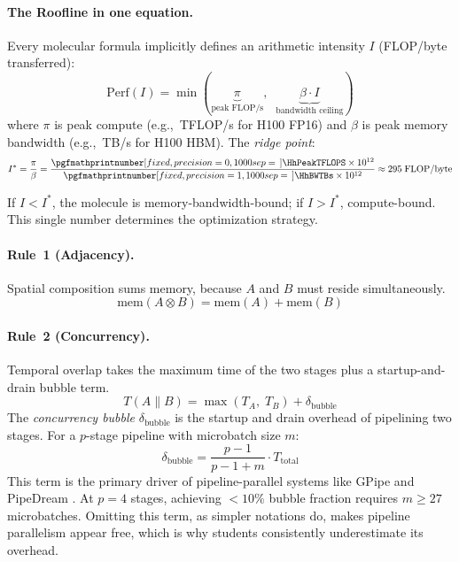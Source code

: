 \documentclass[10pt,twocolumn]{article}
\newcommand{\cval}[1]{\pgfmathprintnumber[fixed, precision=1, 1000 sep={\,}]{#1}}
\newcommand{\cvalint}[1]{\pgfmathprintnumber[fixed, precision=0, 1000 sep={\,}]{#1}}
\begin{document}
\paragraph{The Roofline in one equation.} Every molecular formula implicitly defines an arithmetic intensity $I$ (FLOP/byte transferred):
\begin{equation}
\label{eq:roofline}
\text{Perf}(I) = \min\!\left(\underbrace{\pi}_{\text{peak FLOP/s}},\;\; \underbrace{\beta \cdot I}_{\text{bandwidth ceiling}}\right)
\end{equation}
where $\pi$ is peak compute (e.g., \cvalint{\HhPeakTFLOPS}\,TFLOP/s for H100 FP16) and $\beta$ is peak memory bandwidth (e.g., \cval{\HhBWTBs}\,TB/s for H100 HBM). The \emph{ridge point}:
\begin{equation}
\label{eq:ridge}
I^{*} = \frac{\pi}{\beta} = \frac{\cvalint{\HhPeakTFLOPS} \times 10^{12}}{\cval{\HhBWTBs} \times 10^{12}} \approx 295 \;\text{FLOP/byte}
\end{equation}

If $I < I^{*}$, the molecule is memory-bandwidth-bound; if $I > I^{*}$, compute-bound. This single number determines the optimization strategy.

\paragraph{Rule~1 (Adjacency).} Spatial composition sums memory, because $A$ and $B$ must reside simultaneously.
\begin{equation}
\label{eq:parallel-mem}
\text{mem}(A \otimes B) = \text{mem}(A) + \text{mem}(B)
\end{equation}

\paragraph{Rule~2 (Concurrency).} Temporal overlap takes the maximum time of the two stages plus a startup-and-drain bubble term.
\begin{equation}
\label{eq:concurrent-time}
T(A \parallel B) = \max(T_A,\; T_B) + \delta_{\text{bubble}}
\end{equation}
The \emph{concurrency bubble} $\delta_{\text{bubble}}$ is the startup and drain overhead of pipelining two stages. For a $p$-stage pipeline with microbatch size $m$:
\begin{equation}
\label{eq:bubble}
\delta_{\text{bubble}} = \frac{p - 1}{p - 1 + m} \cdot T_{\text{total}}
\end{equation}
This term is the primary driver of pipeline-parallel systems like GPipe \citep{huang2019gpipe} and PipeDream \citep{narayanan2019}. At $p = 4$ stages, achieving $<10\%$ bubble fraction requires $m \geq 27$ microbatches. Omitting this term, as simpler notations do, makes pipeline parallelism appear free, which is why students consistently underestimate its overhead.
\end{document}
